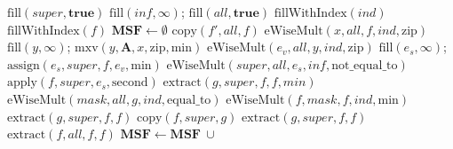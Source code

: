 \documentclass{sokendai_thesis} %
\newcommand{\boruvka}[0]{Boruvka}
\begin{document}
\begin{algorithm}[t]
\caption{The linear algebra \boruvka{}'s algorithm for finding minimum spanning tree. \textbf{Input:} The adjacency matrix $\mathbf{A}$. \textbf{Output:} The matrix $\mathbf{MSF}$ containing the edges in the solution.}
\label{algo:msf}
\begin{algorithmic}[1]
\State $\text{fill} (\mathit{super}, \mathbf{true})$ 
\State $\text{fill} (\mathit{inf}, \infty)$; $\text{fill} (\mathit{all}, \mathbf{true})$ 
\State $\text{fillWithIndex} (\mathit{ind})$ 
\State $\text{fillWithIndex} (\mathit{f})$ 
\State $\mathbf{MSF} \leftarrow \emptyset$ 
\Repeat
    \State $\text{copy} (\mathit{f'}, \mathit{all}, \mathit{f})$
    \State {}
    \State $\text{eWiseMult} (\mathit{x}, \mathit{all}, \mathit{f}, \mathit{ind}, \text{zip})$ 
    \State $\text{fill} (\mathit{y}, \infty)$; $\text{mxv} (\mathit{y}, \mathbf{A}, \mathit{x}, \text{zip}, \text{min})$
    \State $\text{eWiseMult} (\mathit{e_v}, \mathit{all}, \mathit{y}, \mathit{ind}, \text{zip})$ 
    \State $\text{fill} (\mathit{e_s}, \infty)$; $\text{assign} (\mathit{e_s}, \mathit{super}, \mathit{f}, \mathit{e_v}, \text{min})$
    \State $\text{eWiseMult} (\mathit{super}, \mathit{all}, \mathit{e_s}, \mathit{inf}, \text{not\_equal\_to})$
    \State $\text{apply} (\mathit{f}, \mathit{super}, \mathit{e_s}, \text{second})$ %
    \State {}
    \State $\text{extract} (\mathit{g}, \mathit{super}, \mathit{f}, \mathit{f}, \mathit{min})$
    \State $\text{eWiseMult} (\mathit{mask}, \mathit{all}, \mathit{g}, \mathit{ind}, \text{equal\_to})$
    \State $\text{eWiseMult} (\mathit{f}, \mathit{mask}, \mathit{f}, \mathit{ind}, \text{min})$
    \State {}
    \State $\text{extract} (\mathit{g}, \mathit{super}, \mathit{f}, \mathit{f})$
        \State $\text{copy} (\mathit{f}, \mathit{super}, \mathit{g})$
        \State $\text{extract} (\mathit{g}, \mathit{super}, \mathit{f}, \mathit{f})$
    \EndWhile
    \State $\text{extract} (\mathit{f}, \mathit{all}, \mathit{f}, \mathit{f})$
    \State {}
    \State $\mathbf{MSF} \leftarrow \mathbf{MSF}~\cup~$

\end{algorithmic}
\end{algorithm}
\end{document}
